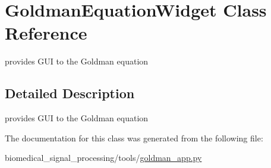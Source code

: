 \hypertarget{classGoldmanEquationWidget}{}\section{Goldman\+Equation\+Widget Class Reference}
\label{classGoldmanEquationWidget}


provides G\+UI to the Goldman equation  




\subsection{Detailed Description}
provides G\+UI to the Goldman equation 

The documentation for this class was generated from the following file\+:\begin{DoxyCompactItemize}
\item 
biomedical\+\_\+signal\+\_\+processing/tools/\hyperlink{goldman__app_8py}{goldman\+\_\+app.\+py}\end{DoxyCompactItemize}
